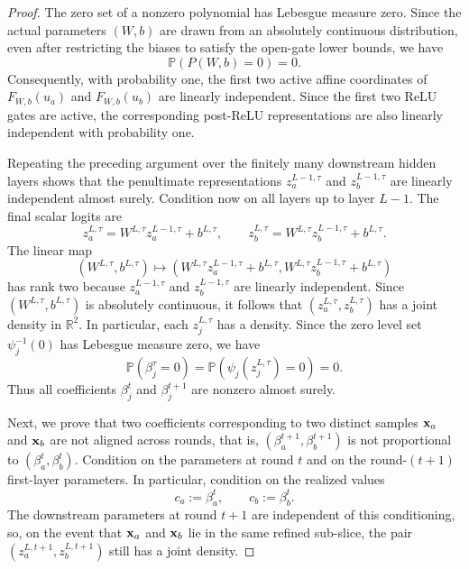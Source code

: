 \begin{proof}
The zero set of a nonzero polynomial has Lebesgue measure zero. Since the
actual parameters $(W,b)$ are drawn from an absolutely continuous distribution,
even after restricting the biases to satisfy the open-gate lower bounds, we
have
\[
\mathbb P(P(W,b)=0)=0.
\]
Consequently, with probability one, the first two active affine coordinates of
$F_{W,b}(u_a)$ and $F_{W,b}(u_b)$ are linearly independent. Since the first two
ReLU gates are active, the corresponding post-ReLU representations are also
linearly independent with probability one.



Repeating the preceding argument over the finitely many
downstream hidden layers shows that the penultimate representations $z_a^{L-1,\tau}$ and $z_b^{L-1,\tau}$ 
are linearly independent almost surely.
%
Condition now on all layers up to layer $L-1$. The final scalar logits are
\[
z_a^{L,\tau}
=
W^{L,\tau}z_a^{L-1,\tau}+b^{L,\tau},
\qquad
z_b^{L,\tau}
=
W^{L,\tau}z_b^{L-1,\tau}+b^{L,\tau}.
\]
The linear map
\[
(W^{L,\tau},b^{L,\tau})
\mapsto
\left(
W^{L,\tau}z_a^{L-1,\tau}+b^{L,\tau},
W^{L,\tau}z_b^{L-1,\tau}+b^{L,\tau}
\right)
\]
has rank two because $z_a^{L-1,\tau}$ and $z_b^{L-1,\tau}$ are linearly independent. Since $(W^{L,\tau},b^{L,\tau})$ is absolutely continuous, it follows that $(z_a^{L,\tau},z_b^{L,\tau})$ has a joint density in $\mathbb R^2$.
In particular, each $z_j^{L,\tau}$ has a density. Since the zero level set
$\psi_j^{-1}(0)$ has Lebesgue measure zero, we have
\[
\mathbb P(\beta_j^\tau=0)
=
\mathbb P(\psi_j(z_j^{L,\tau})=0)
=0.
\]
Thus all coefficients $\beta_j^t$ and $\beta_j^{t+1}$ are nonzero almost
surely.

Next, we prove that two coefficients corresponding to two distinct samples ${\mathbf{x}}_a$ and ${\mathbf{x}}_b$ are not aligned across rounds, that is, $(\beta_a^{t+1}, \beta_b^{t+1})$ is not proportional to $(\beta_a^{t}, \beta_b^{t})$. Condition on the parameters at round $t$ and on the
round-$(t+1)$ first-layer parameters. In particular, condition on the realized
values
\[
c_a:=\beta_a^t,
\qquad
c_b:=\beta_b^t.
\]
The downstream parameters at round $t+1$ are independent of this conditioning,
so, on the event that ${\mathbf{x}}_a$ and ${\mathbf{x}}_b$ lie in the same refined sub-slice, the
pair $(z_a^{L,t+1},z_b^{L,t+1})$ still has a joint density.


\end{proof}
